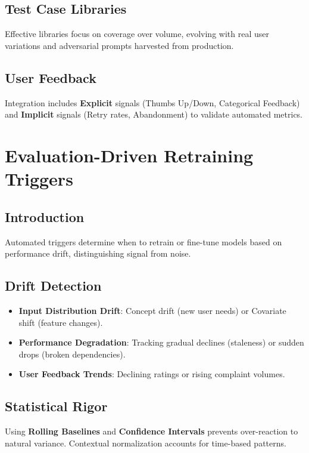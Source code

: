 \begin{TNtwocol}
\subsection{Test Case Libraries}
Effective libraries focus on coverage over volume, evolving with real user variations and adversarial prompts harvested from production.

\subsection{User Feedback}
Integration includes \textbf{Explicit} signals (Thumbs Up/Down, Categorical Feedback) and \textbf{Implicit} signals (Retry rates, Abandonment) to validate automated metrics.
\section{Evaluation-Driven Retraining Triggers}
\subsection{Introduction}
Automated triggers determine when to retrain or fine-tune models based on performance drift, distinguishing signal from noise.

\subsection{Drift Detection}
\begin{itemize}
    \item \textbf{Input Distribution Drift}: Concept drift (new user needs) or Covariate shift (feature changes).
    \item \textbf{Performance Degradation}: Tracking gradual declines (staleness) or sudden drops (broken dependencies).
    \item \textbf{User Feedback Trends}: Declining ratings or rising complaint volumes.
\end{itemize}

\end{TNtwocol}
\subsection{Statistical Rigor}
Using \textbf{Rolling Baselines} and \textbf{Confidence Intervals} prevents over-reaction to natural variance. Contextual normalization accounts for time-based patterns.
